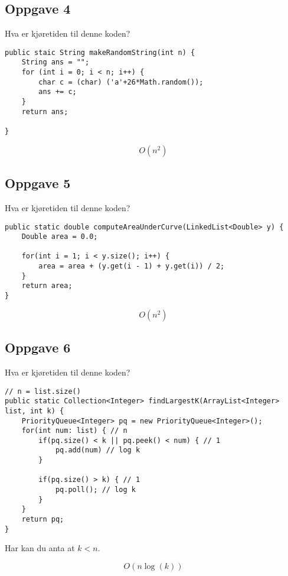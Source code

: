 \documentclass{article}
\begin{document}
    \subsection{Oppgave 4}
    Hva er kjøretiden til denne koden?
    \begin{lstlisting}
public staic String makeRandomString(int n) {
    String ans = "";
    for (int i = 0; i < n; i++) {
        char c = (char) ('a'+26*Math.random());
        ans += c;
    }
    return ans;
    
} 
    \end{lstlisting}

    \begin{ans}
        \[ O(n^2) \]
    \end{ans}

    \subsection{Oppgave 5}
    Hva er kjøretiden til denne koden?

    \begin{lstlisting}
public static double computeAreaUnderCurve(LinkedList<Double> y) {
    Double area = 0.0;

    for(int i = 1; i < y.size(); i++) {
        area = area + (y.get(i - 1) + y.get(i)) / 2;
    }
    return area;
}
    \end{lstlisting}

    \begin{ans}
        \[ O(n^2) \]
    \end{ans}

    \subsection{Oppgave 6}
    Hva er kjøretiden til denne koden?
    \begin{lstlisting}
// n = list.size() 
public static Collection<Integer> findLargestK(ArrayList<Integer> list, int k) {
    PriorityQueue<Integer> pq = new PriorityQueue<Integer>();
    for(int num: list) { // n
        if(pq.size() < k || pq.peek() < num) { // 1
            pq.add(num) // log k
        }

        if(pq.size() > k) { // 1
            pq.poll(); // log k
        }
    }
    return pq;
}
    \end{lstlisting}
    Har kan du anta at \( k < n \).

    \begin{ans}
        \[ O\left( n \log\left( k \right) \right) \]
    \end{ans}
\end{document}
